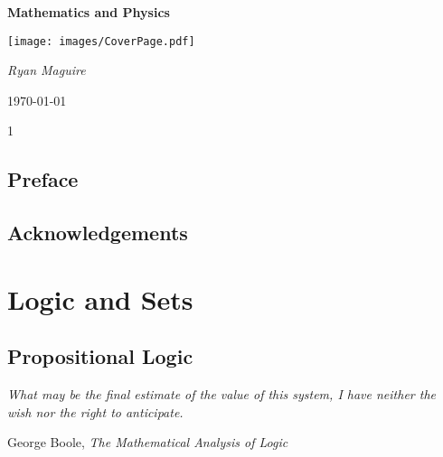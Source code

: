 \documentclass{book}                                                           %
\def\compilefoundations{1}
\begin{document}
    \pagecolor{CoverPage}
    \begin{titlepage}
        \centering
        \LARGE{\bfseries{Mathematics and Physics}}
        \par\vspace{3.5cm}
        \texttt{[image: images/CoverPage.pdf]}
        \par\vspace{4cm}
        \Large{\itshape{Ryan Maguire}}
        \par\vspace{1.5ex}
        \normalsize{\today}
    \end{titlepage}
    \nopagecolor
    \tableofcontents
    \listoffigures
    \listoftables
    \clearpage

    \if\compilefoundations1
        \chapter*{Preface}
            
        \clearpage
        \chapter*{Acknowledgements}
            
        \clearpage
            \renewcommand{\TOPPATH}{books/Foundations}
            \label{book:Foundations}%
            \renewcommand{\PARPATH}{\TOPPATH/Logic_and_Sets}
            \part{Logic and Sets}
                \chapter{Propositional Logic}
                    \hfill
                    \begin{minipage}[b]{0.7\textwidth}
                        \itshape
                        What may be the final estimate of the value of this
                        system, I have neither the wish nor the right to
                        anticipate.
                        \par\hfill\par
                        \hfill
                        \normalfont
                        George Boole,
                        \itshape
                        The Mathematical Analysis of Logic
                    \end{minipage}
                    \par\hfill\par
                    \renewcommand{\PATH}{\PARPATH/Propositional_Logic}
                    \label{chapt:Propositional_Logic}%
                    
                    
\end{document}
